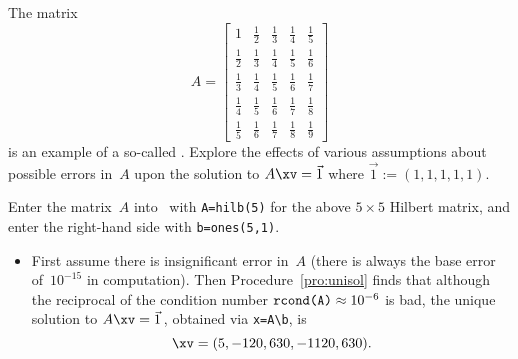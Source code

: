 \begin{example} \label{eg:hilb5}
The matrix 
\begin{equation*}
A=\begin{bmatrix} 1&\frac12&\frac13&\frac14&\frac15
\\\frac12&\frac13&\frac14&\frac15&\frac16
\\\frac13&\frac14&\frac15&\frac16&\frac17
\\\frac14&\frac15&\frac16&\frac17&\frac18
\\\frac15&\frac16&\frac17&\frac18&\frac19
\end{bmatrix}
\end{equation*}
is an example of a so-called .
Explore the effects of various assumptions about possible errors in~\(A\) upon the solution to \(A\xv=\vec 1\) where \(\vec1:=(1,1,1,1,1)\).
\begin{solution} 
Enter the matrix~\(A\) into \script\ with \verb|A=hilb(5)| for the above \(5\times5\) Hilbert matrix, and enter the right-hand side with \verb|b=ones(5,1)|.
\begin{itemize}
\item First assume there is insignificant error in~\(A\) (there is always the base error of~\(10^{-15}\) in computation).
Then Procedure~\ref{pro:unisol} finds that although the reciprocal of the condition number \(\verb|rcond(A)|\approx10^{-6}\) is bad, the unique solution to \(A\xv=\vec1\)\,, obtained via \verb|x=A\b|, is
\begin{equation*}
\xv=(5,-120,630,-1120,630).
\end{equation*}
 
\setbox\ajrqrbox\hbox{}%
\marginpar{\usebox{\ajrqrbox\\[2ex]}}%


\end{itemize}
\end{solution}
\end{example}
